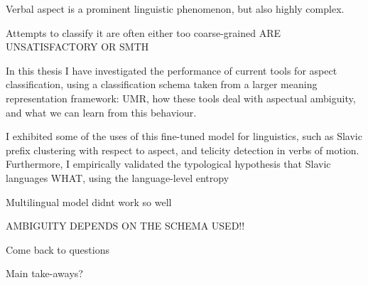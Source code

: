 Verbal aspect is a prominent linguistic phenomenon, but also highly complex.

Attempts to classify it are often either too coarse-grained ARE UNSATISFACTORY OR SMTH

In this thesis I have investigated the performance of current tools for aspect classification, using a classification schema taken from a larger meaning representation framework: UMR, how these tools deal with aspectual ambiguity, and what we can learn from this behaviour.

I exhibited some of the uses of this fine-tuned model for linguistics, such as Slavic prefix clustering with respect to aspect, and telicity detection in verbs of motion. Furthermore, I empirically validated the typological hypothesis that Slavic languages WHAT, using the language-level entropy


Multilingual model didnt work so well

AMBIGUITY DEPENDS ON THE SCHEMA USED!!

Come back to questions

Main take-aways?